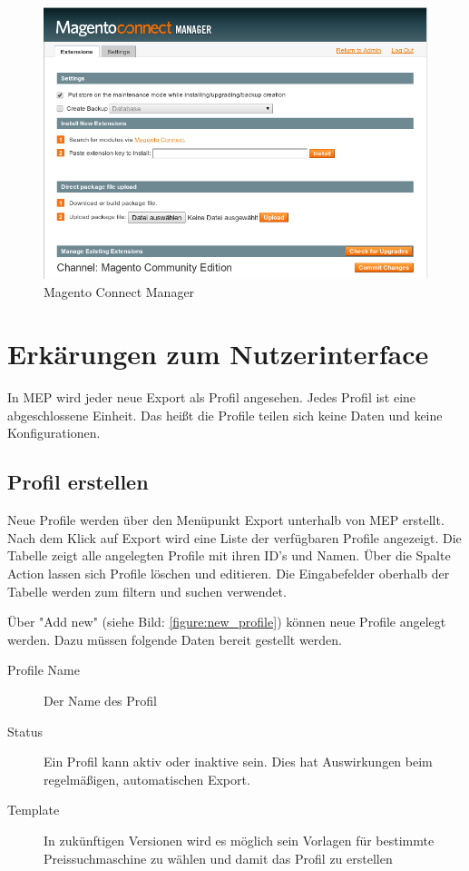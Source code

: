 \documentclass[a4paper,12pt]{book}
\begin{document}
\begin{figure}
 \includegraphics[width=1\textwidth]{img/bild01.png}
  \caption{Magento Connect Manager}
  \label{figure:install}
\end{figure}

\chapter{Erkärungen zum Nutzerinterface}
In MEP wird jeder neue Export als Profil angesehen. Jedes Profil ist
eine abgeschlossene Einheit. Das heißt die Profile teilen sich keine
Daten und keine Konfigurationen.

\section{Profil erstellen}
\label{sec:create}

Neue Profile werden über den Menüpunkt Export unterhalb von MEP 
erstellt. Nach dem Klick auf Export wird eine Liste der verfügbaren
Profile angezeigt. Die Tabelle zeigt alle angelegten Profile mit ihren 
ID's und Namen. Über die Spalte Action lassen sich Profile löschen 
und editieren. Die Eingabefelder oberhalb der Tabelle werden zum 
filtern und suchen verwendet.

Über "Add new" (siehe Bild: \ref{figure:new_profile}) 
können neue Profile angelegt werden. Dazu müssen folgende Daten 
bereit gestellt werden.

\begin{description}
\item[Profile Name] Der Name des Profil
\item[Status] Ein Profil kann aktiv oder inaktive sein. Dies hat
Auswirkungen beim regelmäßigen, automatischen Export.
\item[Template] In zukünftigen Versionen wird es möglich sein Vorlagen
für bestimmte Preissuchmaschine zu wählen und damit das Profil zu
erstellen
\end{description}
\end{document}
